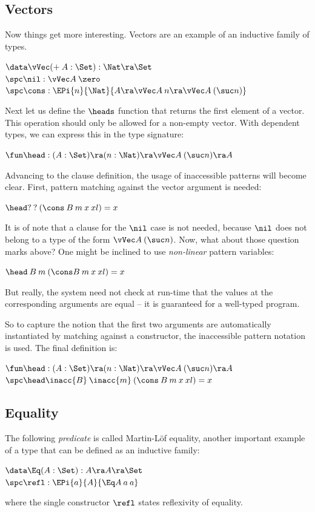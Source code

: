 \subsection{Vectors}
Now things get more interesting. Vectors are an example of an inductive family of types.
\begin{bsp}
$\data \vVec ( + \: A : \Set ) : \Nat \ra \Set $ \\
$\spc \nil : \vVec A \: \zero  $\\
$ \spc \cons : \EPi{n}{\Nat}{ A \ra \vVec A \: n \ra \vVec A \: (\suc n)} $
\end{bsp}
Next let us define the $\heads$ function that returns the first element of a vector. This operation should only be allowed for a non-empty vector.
With dependent types, we can express this in the type signature:
\begin{bsp}
$ \fun \head : ( A : \Set ) \ra ( n : \Nat ) \ra \vVec A \: (\suc n) \ra A $
\end{bsp}
Advancing to the clause definition, the usage of inaccessible patterns will become clear.
First, pattern matching against the vector argument is needed:
\begin{bsp}
$\head ? \: ? \: (\cons \: B \: m \: x \: xl) = x $
\end{bsp}
It is of note that a clause for the $\nil$ case is not needed, because $\nil$ does not belong to a type of the form $\vVec A \: (\suc n)$.
Now, what about those question marks above? 
One might be inclined to use \emph{non-linear} pattern variables:
\begin{bsp}
$\head \: B \: m \: (\cons  B \: m \: x \: xl) = x $
\end{bsp}
But really, the system need not check at run-time that the values at the corresponding arguments are equal -- it is guaranteed for a well-typed program.

So to capture the notion that the first two arguments are automatically instantiated by matching against a constructor, the inaccessible pattern notation \cite{norell:thesis,GoguHMcBrCM2006} is used. The final definition is:
\begin{bsp}
$ \fun \head : ( A : \Set ) \ra ( n : \Nat ) \ra \vVec A \: (\suc n) \ra A $\\
$ \spc \head \inacc{B} \: \inacc{m} \: (\cons \: B \: m \: x \: xl) = x $
\end{bsp}
\subsection{Equality}
The following \emph{predicate} is called Martin-L\"of equality, another important example of a type that can be defined as an inductive family:
\begin{bsp}
$\data \Eq ( A : \Set ) : A \ra A \ra \Set $ \\
$\spc \refl : \EPi{a}{A}{\Eq A \: a \: a}$
\end{bsp}
where the single constructor $\refl$ states reflexivity of equality.

